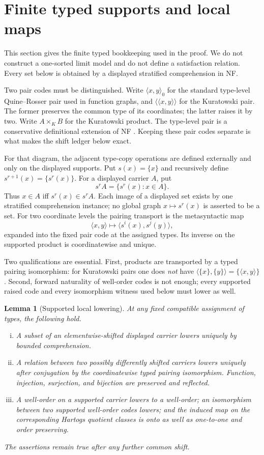 \documentclass[11pt]{article}
\newtheorem{lemma}[theorem]{Lemma}
\numberwithin{equation}{section}
\theoremstyle{definition}
\theoremstyle{remark}
\begin{document}
\section{Finite typed supports and local maps}

This section gives the finite typed bookkeeping used in the proof.  We do
not construct a one-sorted limit model and do not define a satisfaction
relation.  Every set below is obtained by a displayed stratified
comprehension in NF.

Two pair codes must be distinguished.  Write
$\langle x,y\rangle_0$ for the standard type-level Quine--Rosser pair used
in function graphs, and $\langle\!\langle x,y\rangle\!\rangle$ for the
Kuratowski pair.  The former preserves the common type of its coordinates;
the latter raises it by two.  Write $A\times_KB$ for the Kuratowski product.
The type-level pair is a conservative definitional extension of NF
\cite{Forster,HolmesBook}.  Keeping these pair codes separate is what makes
the shift ledger below exact.

For that diagram, the adjacent type-copy operations are defined externally
and only on the displayed supports.  Put $s(x)=\{x\}$ and recursively
define $s^{r+1}(x)=\{s^r(x)\}$.  For a displayed carrier $A$, put
\[
 s^rA=\{s^r(x):x\in A\}.
\]
Thus $x\in A$ iff $s^r(x)\in s^rA$.  Each image of a displayed set
exists by one stratified comprehension instance; no global graph
$x\mapsto s^r(x)$ is asserted to be a set.  For two coordinate levels the
pairing transport is the metasyntactic map
\[
 \langle x,y\rangle\longmapsto
 \langle s^i(x),s^j(y)\rangle,
\]
expanded into the fixed pair code at the assigned types.  Its inverse on
the supported product is coordinatewise and unique.

Two qualifications are essential.  First, products are transported by a
typed pairing isomorphism: for Kuratowski pairs one does \emph{not} have
$\langle\{x\},\{y\}\rangle=\{\langle x,y\rangle\}$.  Second, forward
naturality of well-order codes is not enough; every supported raised code
and every isomorphism witness used below must lower as well.

\begin{lemma}[Supported local lowering]
\label{lem:local-lowering}
At any fixed compatible assignment of types, the following hold.
\begin{enumerate}[(i)]
\item A subset of an elementwise-shifted displayed carrier lowers uniquely
      by bounded comprehension.
\item A relation between two possibly differently shifted carriers lowers
      uniquely after conjugation by the coordinatewise typed pairing
      isomorphism.  Function, injection, surjection, and bijection are
      preserved and reflected.
\item A well-order on a supported carrier lowers to a well-order; an
      isomorphism between two supported well-order codes lowers; and the
      induced map on the corresponding Hartogs quotient classes is onto as
      well as one-to-one and order preserving.
\end{enumerate}
The assertions remain true after any further common shift.
\end{lemma}
\end{document}
